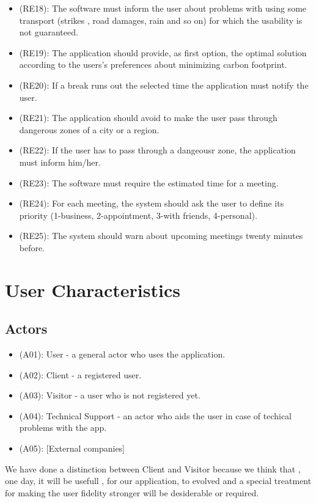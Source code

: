 \documentclass[a4paper,leqno]{book}
\begin{document}
\begin{itemize}
	\item (RE18): The software must inform the user about problems with using some transport (strikes , road damages, rain and so on) for which the usability is not guaranteed.
	\item (RE19): The application should provide, as first option, the optimal solution according to the users's preferences about minimizing carbon footprint.
	\item (RE20): If a break runs out the selected time the application must notify the user.
	\item (RE21): The application should avoid to make the user pass through dangerous zones of a city or a region.
	\item (RE22): If the user has to pass through a dangeousr zone, the application must inform him/her.
	\item (RE23):  The software must require the estimated time for a meeting.
	\item (RE24): For each meeting, the system should ask the user to define its priority (1-business, 2-appointment, 3-with friends, 4-personal).
	\item (RE25): The system should warn about upcoming meetings twenty minutes before.
\end{itemize}

\section{User Characteristics}
\subsection{Actors}
\begin{itemize}
	\item (A01): User - a general actor who uses the application.
		\item (A02): Client - a registered user.
		\item (A03): Visitor - a user who is not registered yet.
	\item (A04): Technical Support - an actor who aids the user in case of techical problems with the app.
	\item (A05): [External companies]
\end{itemize}

We have done a distinction between Client and Visitor because we think that , one day, 
it will be usefull , for our application, to evolved and a special treatment for making the 
user fidelity stronger will be desiderable or required.
\end{document}
